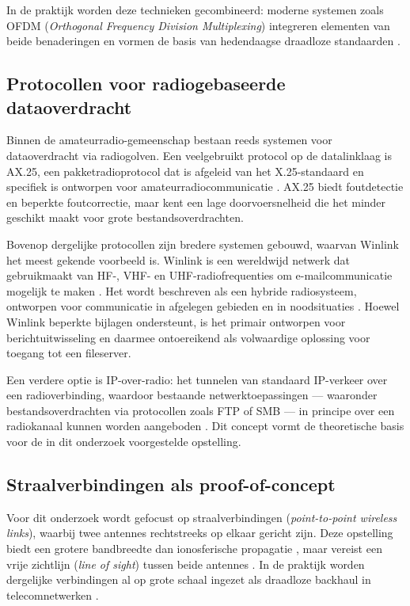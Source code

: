 In de praktijk worden deze technieken gecombineerd: moderne systemen zoals OFDM (\textit{Orthogonal Frequency Division Multiplexing}) integreren elementen van beide benaderingen en vormen de basis van hedendaagse draadloze standaarden \autocite{Tanenbaum2021}.

\subsection{Protocollen voor radiogebaseerde dataoverdracht}

Binnen de amateurradio-gemeenschap bestaan reeds systemen voor dataoverdracht via radiogolven. Een veelgebruikt protocol op de datalinklaag is AX.25, een pakketradioprotocol dat is afgeleid van het X.25-standaard en specifiek is ontworpen voor amateurradiocommunicatie \autocite{Tanenbaum2021}. AX.25 biedt foutdetectie en beperkte foutcorrectie, maar kent een lage doorvoersnelheid die het minder geschikt maakt voor grote bestandsoverdrachten.

Bovenop dergelijke protocollen zijn bredere systemen gebouwd, waarvan Winlink het meest gekende voorbeeld is. Winlink is een wereldwijd netwerk dat gebruikmaakt van HF-, VHF- en UHF-radiofrequenties om e-mailcommunicatie mogelijk te maken \autocite{WinlinkOverview}. Het wordt beschreven als een hybride radiosysteem, ontworpen voor communicatie in afgelegen gebieden en in noodsituaties \autocite{WinlinkEmcomm, WinlinkHybrid}. Hoewel Winlink beperkte bijlagen ondersteunt, is het primair ontworpen voor berichtuitwisseling en daarmee ontoereikend als volwaardige oplossing voor toegang tot een fileserver.

Een verdere optie is IP-over-radio: het tunnelen van standaard IP-verkeer over een radioverbinding, waardoor bestaande netwerktoepassingen — waaronder bestandsoverdrachten via protocollen zoals FTP of SMB — in principe over een radiokanaal kunnen worden aangeboden \autocite{Tanenbaum2021}. Dit concept vormt de theoretische basis voor de in dit onderzoek voorgestelde opstelling.

\subsection{Straalverbindingen als proof-of-concept}

Voor dit onderzoek wordt gefocust op straalverbindingen (\textit{point-to-point wireless links}), waarbij twee antennes rechtstreeks op elkaar gericht zijn. Deze opstelling biedt een grotere bandbreedte dan ionosferische propagatie \autocite{WirelessBackhaulSurvey, MicrowavePtP5G}, maar vereist een vrije zichtlijn (\textit{line of sight}) tussen beide antennes \autocite{MicrowavePtP5G}. In de praktijk worden dergelijke verbindingen al op grote schaal ingezet als draadloze backhaul in telecomnetwerken \autocite{WirelessBackhaulSurvey}.

